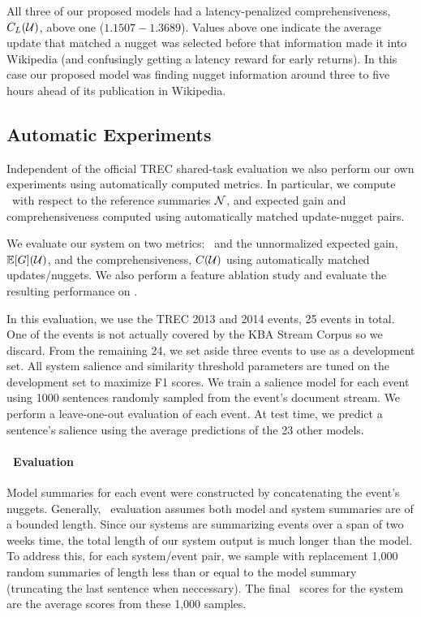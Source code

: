 All three of our proposed models had a latency-penalized comprehensiveness,
$C_L(\mathcal{U})$, above one ($1.1507 - 1.3689$). Values above
one indicate the average update that matched a nugget was selected before that
information made it into Wikipedia (and confusingly getting a latency reward
for early returns). In this case our proposed model was finding nugget
information around three to five hours ahead of its publication in Wikipedia.  

\subsection{Automatic Experiments}

Independent of the official TREC shared-task evaluation we also perform our own
experiments using automatically computed metrics.  In particular, we compute
\rouge~with respect to the reference summaries $\mathcal{N}$, and expected gain
and comprehensiveness computed using automatically matched update-nugget pairs.

We evaluate our system on two metrics: \rouge~and the unnormalized expected
gain, $\mathbb{E}[G](\mathcal{U})$, and the comprehensiveness, $C(\mathcal{U})$
using automatically matched updates/nuggets.  We also perform a feature
ablation study and evaluate the resulting performance on \rouge.

In this evaluation, we use the TREC 2013 and 2014 events, 25 events in total.
One of the events is not actually covered by the KBA Stream Corpus so we
discard.  From the remaining 24, we set aside three events to use as a
development set. All system salience and similarity threshold parameters are
tuned on the development set to maximize  F1 scores.  We train a
salience model for each event using 1000 sentences randomly sampled from the
event's document stream.  We perform a leave-one-out evaluation of each event.
At test time, we predict a sentence's salience using the average predictions of
the 23 other models.   

\paragraph{\rouge~Evaluation}

Model summaries for each event were constructed by concatenating the event's
nuggets. Generally, \rouge~evaluation assumes both model and system summaries
are of a bounded length. Since our systems are summarizing events over a span
of two weeks time, the total length of our system output is much longer than
the model. To address this, for each system/event pair, we sample with
replacement 1,000 random summaries of length less than or equal to the model
summary (truncating the last sentence when neccessary). The final \rouge~scores
for the system are the average scores from these 1,000 samples.

